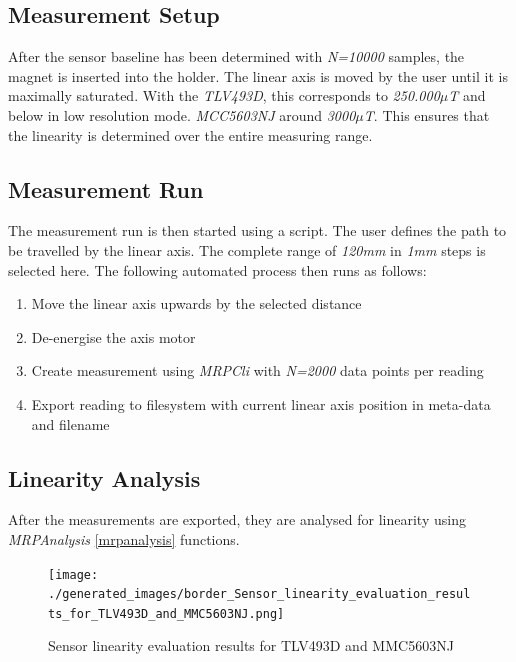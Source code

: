 \hypertarget{measurement-setup}{%
\subsection{Measurement Setup}\label{measurement-setup}}

After the sensor baseline has been determined with \emph{N=10000}
samples, the magnet is inserted into the holder. The linear axis is
moved by the user until it is maximally saturated. With the
\emph{TLV493D}, this corresponds to \emph{250.000\(\mu\)T} and below in
low resolution mode. \emph{MCC5603NJ} around \emph{3000\(\mu\)T}. This
ensures that the linearity is determined over the entire measuring
range.

\hypertarget{measurement-run}{%
\subsection{Measurement Run}\label{measurement-run}}

The measurement run is then started using a script. The user defines the
path to be travelled by the linear axis. The complete range of
\emph{120mm} in \emph{1mm} steps is selected here. The following
automated process then runs as follows:

\begin{enumerate}
\def\labelenumi{\arabic{enumi}.}
\tightlist
\item
  Move the linear axis upwards by the selected distance
\item
  De-energise the axis motor
\item
  Create measurement using \emph{MRPCli} with \emph{N=2000} data points
  per reading
\item
  Export reading to filesystem with current linear axis position in
  meta-data and filename
\end{enumerate}

\hypertarget{linearity-analysis}{%
\subsection{Linearity Analysis}\label{linearity-analysis}}

After the measurements are exported, they are analysed for linearity
using \emph{MRPAnalysis} \ref{mrpanalysis} functions.

\begin{figure}
\centering
\texttt{[image: ./generated\_images/border\_Sensor\_linearity\_evaluation\_results\_for\_TLV493D\_and\_MMC5603NJ.png]}
\caption{Sensor linearity evaluation results for TLV493D and MMC5603NJ
\label{Sensor_linearity_evaluation_results_for_TLV493D_and_MMC5603NJ.png}}
\end{figure}

